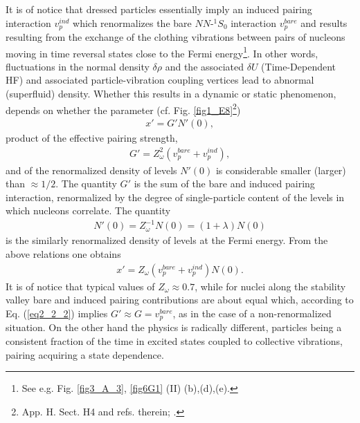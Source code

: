 It is of notice that dressed particles essentially imply an induced pairing interaction $v_p^{ind}$ which renormalizes the bare $NN$-$^1S_0$ interaction $v_p^{bare}$ and results resulting from the exchange of the clothing vibrations between pairs of nucleons moving in time reversal states close to the Fermi energy\footnote{See e.g. Fig. \ref{fig3_A_3},  \ref{fig6G1} (II) (b),(d),(e).}. In other words, fluctuations in the normal density $\delta \rho$ and the associated $\delta U$ (Time-Dependent HF) and associated particle-vibration coupling vertices lead to abnormal (superfluid) density. Whether this results in  a dynamic or static phenomenon, depends on whether the parameter (cf. Fig. \ref{fig1_E8}\footnote{\cite{Brink:05} App. H. Sect. H4 and refs. therein; \cite{Barranco:05}.}) 
\begin{align}\label{eq2_1_10}
x'=G'N'(0),  
\end{align}
product of the effective pairing strength, 
\begin{align}\label{eq2_2_2}
G'=Z_\omega^2(v_p^{bare}+v_p^{ind}),
\end{align}
and of the renormalized density of levels $N'(0)$ is considerable smaller  (larger) than $\approx1/2$. The quantity $G'$ is the sum of the bare and induced pairing interaction, renormalized by the degree of single-particle content of the levels in which nucleons correlate. The quantity 
\begin{align}
N'(0)=Z_\omega^{-1}N(0)=(1+\lambda)N(0)
\end{align}
is the similarly renormalized density of levels at the Fermi energy. From the above relations one obtains 
\begin{align}
x'=Z_\omega(v_p^{bare}+v_p^{ind})N(0).
\end{align}
It is of notice that typical values of $Z_\omega\approx0.7$, while for nuclei along the stability valley bare and induced pairing contributions are about equal which, according to Eq. (\ref{eq2_2_2}) implies $G'\approx G=v^{bare}_p$, as in the case of a non-renormalized situation. On the other hand the physics is radically different, particles being a consistent fraction of the time in excited states coupled to collective vibrations, pairing acquiring a state dependence. 
 
